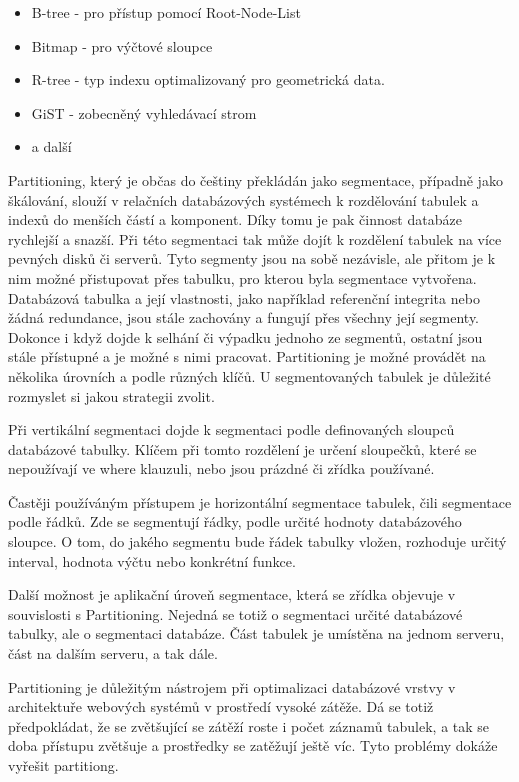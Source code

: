 \documentclass[12pt]{article}
\begin{document}
\begin{itemize}
\item B-tree - pro přístup pomocí Root-Node-List
\item Bitmap - pro výčtové sloupce
\item R-tree - typ indexu optimalizovaný pro geometrická data.
\item GiST - zobecněný vyhledávací strom
\item a další
\end{itemize}


Partitioning, který je občas do češtiny překládán jako segmentace, případně jako škálování, slouží v relačních databázových systémech k rozdělování tabulek a indexů do menších částí a komponent. Díky tomu je pak činnost databáze rychlejší a snazší. Při této segmentaci tak může dojít k rozdělení tabulek na více pevných disků či serverů. Tyto segmenty jsou na sobě nezávisle, ale přitom je k nim možné přistupovat přes tabulku, pro kterou byla segmentace vytvořena. Databázová tabulka a její vlastnosti, jako například referenční integrita nebo žádná redundance, jsou stále zachovány a fungují přes všechny její segmenty. Dokonce i když dojde k selhání či výpadku jednoho ze segmentů, ostatní jsou stále přístupné a je možné s nimi pracovat. Partitioning je možné provádět na několika úrovních a podle různých klíčů. U segmentovaných tabulek je důležité rozmyslet si jakou strategii zvolit. 

Při vertikální segmentaci dojde k segmentaci podle definovaných sloupců databázové tabulky. Klíčem při tomto rozdělení je určení sloupečků, které se nepoužívají ve where klauzuli, nebo jsou prázdné či zřídka používané. 

Častěji používáným přístupem je horizontální segmentace tabulek, čili segmentace podle řádků. Zde se segmentují řádky, podle určité hodnoty databázového sloupce. O tom, do jakého segmentu bude řádek tabulky vložen, rozhoduje určitý interval, hodnota výčtu nebo konkrétní funkce.

Další možnost je aplikační úroveň segmentace, která se zřídka objevuje v souvislosti s Partitioning. Nejedná se totiž o segmentaci určité databázové tabulky, ale o segmentaci databáze. Část tabulek je umístěna na jednom serveru, část na dalším serveru, a tak dále.

Partitioning je důležitým nástrojem při optimalizaci databázové vrstvy v architektuře webových systémů v prostředí vysoké zátěže. Dá se totiž předpokládat, že se zvětšující se zátěží roste i počet záznamů tabulek, a tak se doba přístupu zvětšuje a prostředky se zatěžují ještě víc. Tyto problémy dokáže vyřešit partitiong.
\cite{partitioning-db}
\end{document}
